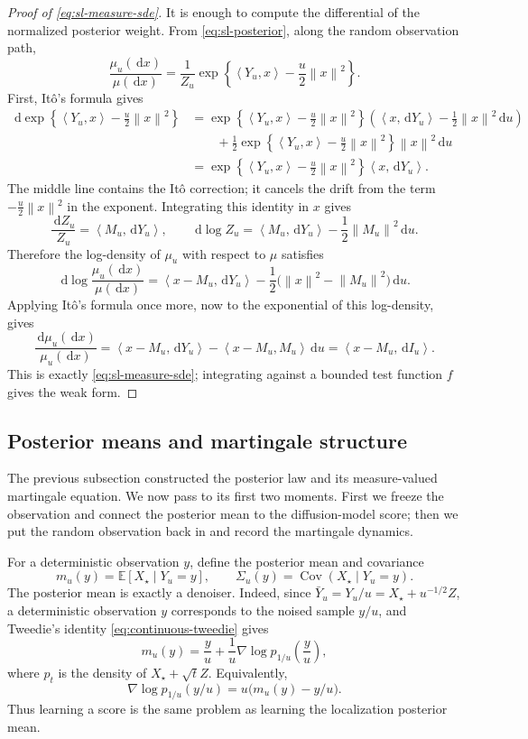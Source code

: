 \documentclass[10pt,a4paper]{amsart}
\numberwithin{equation}{section}
\DeclareMathOperator{\Cov}{Cov}
\newcommand{\E}{\mathbb{E}}
\newcommand{\dd}{\,\mathrm{d}}
\newcommand{\norm}[1]{\left\lVert #1 \right\rVert}
\newcommand{\ip}[2]{\left\langle #1,#2 \right\rangle}
\begin{document}
\begin{proof}[Proof of \eqref{eq:sl-measure-sde}]
It is enough to compute the differential of the normalized posterior weight.
From \eqref{eq:sl-posterior}, along the random observation path,
\[
    \frac{\mu_u(\dd x)}{\mu(\dd x)}
    =
    \frac{1}{Z_u}
    \exp\left\{\ip{Y_u}{x}-\frac{u}{2}\norm{x}^2\right\}.
\]
First, It\^o's formula gives
\[
    \begin{aligned}
    \dd
    \exp\left\{\ip{Y_u}{x}-\frac{u}{2}\norm{x}^2\right\}
    &=
    \exp\left\{\ip{Y_u}{x}-\frac{u}{2}\norm{x}^2\right\}
    \left(\ip{x}{\dd Y_u}-\frac12\norm{x}^2\dd u\right)
    \\
    &\qquad
    +
    \frac12
    \exp\left\{\ip{Y_u}{x}-\frac{u}{2}\norm{x}^2\right\}
    \norm{x}^2\dd u
    \\
    &=
    \exp\left\{\ip{Y_u}{x}-\frac{u}{2}\norm{x}^2\right\}
    \ip{x}{\dd Y_u}.
    \end{aligned}
\]
The middle line contains the It\^o correction; it cancels the drift from
the term $-\frac u2\norm{x}^2$ in the exponent.  Integrating this identity
in $x$ gives
\[
    \frac{\dd Z_u}{Z_u}=\ip{M_u}{\dd Y_u},
    \qquad
    \dd\log Z_u=\ip{M_u}{\dd Y_u}-\frac12\norm{M_u}^2\dd u.
\]
Therefore the log-density of $\mu_u$ with respect to $\mu$ satisfies
\[
    \dd\log\frac{\mu_u(\dd x)}{\mu(\dd x)}
    =
    \ip{x-M_u}{\dd Y_u}
    -
    \frac12\bigl(\norm{x}^2-\norm{M_u}^2\bigr)\dd u.
\]
Applying It\^o's formula once more, now to the exponential of this
log-density, gives
\[
    \frac{\dd\mu_u(\dd x)}{\mu_u(\dd x)}
    =
    \ip{x-M_u}{\dd Y_u}
    -
    \ip{x-M_u}{M_u}\dd u
    =
    \ip{x-M_u}{\dd I_u}.
\]
This is exactly \eqref{eq:sl-measure-sde}; integrating against a bounded test
function $f$ gives the weak form.
\end{proof}

\subsection{Posterior means and martingale structure}

The previous subsection constructed the posterior law and its measure-valued
martingale equation.  We now pass to its first two moments.  First we freeze
the observation and connect the posterior mean to the diffusion-model score;
then we put the random observation back in and record the martingale dynamics.

For a deterministic observation $y$, define the posterior mean and covariance
\[
    m_u(y)=\E[X_\star\mid Y_u=y],
    \qquad
    \Sigma_u(y)=\Cov(X_\star\mid Y_u=y).
\]
The posterior mean is exactly a denoiser.  Indeed, since
$\bar Y_u=Y_u/u=X_\star+u^{-1/2}Z$, a deterministic observation $y$
corresponds to the noised sample $y/u$, and Tweedie's identity
\eqref{eq:continuous-tweedie} gives
\begin{equation}\label{eq:sl-tweedie}
    m_u(y)
    =
    \frac{y}{u}
    +
    \frac{1}{u}
    \nabla\log p_{1/u}\!\left(\frac{y}{u}\right),
\end{equation}
where $p_t$ is the density of $X_\star+\sqrt{t}Z$.  Equivalently,
\[
    \nabla\log p_{1/u}(y/u)
    =
    u\bigl(m_u(y)-y/u\bigr).
\]
Thus learning a score is the same problem as learning the
localization posterior mean.
\end{document}
